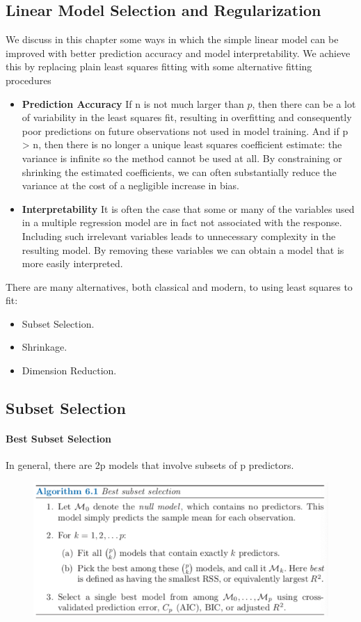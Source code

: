 \subsection{Linear Model Selection and Regularization}
We discuss in this chapter some ways in which the simple linear model can be improved with better prediction accuracy and model interpretability. We achieve this by replacing plain least squares fitting with some alternative fitting procedures

\begin{itemize}
    \item \textbf{Prediction Accuracy} If n is not much larger than $p$, then there can be a lot of variability in the least squares fit, resulting in overfitting and consequently poor predictions on future observations not used in model training. And if p > n, then there is no longer a unique least squares coefficient estimate: the variance is infinite so the method cannot be used at all. By constraining or shrinking the estimated coefficients, we can often substantially reduce the variance at the cost of a negligible increase in bias.
    \item \textbf{Interpretability}  It is often the case that some or many of the variables used in a multiple regression model are in fact not associated with the response. Including such irrelevant variables leads to unnecessary complexity in the resulting model. By removing these variables we can obtain a model that is more easily interpreted.
\end{itemize}


There are many alternatives, both classical and modern, to using least squares to fit:
\begin{itemize}
    \item Subset Selection. 
    \item Shrinkage.
    \item Dimension Reduction. 
\end{itemize}

\subsection{Subset Selection}
\paragraph{Best Subset Selection}
In general, there are 2p models that involve subsets of p predictors.
\begin{figure}[!ht]
    \centering
    \includegraphics[scale=0.6]{SRC/StatisticalLearning/BestSubsetSelection.png}
\end{figure}

